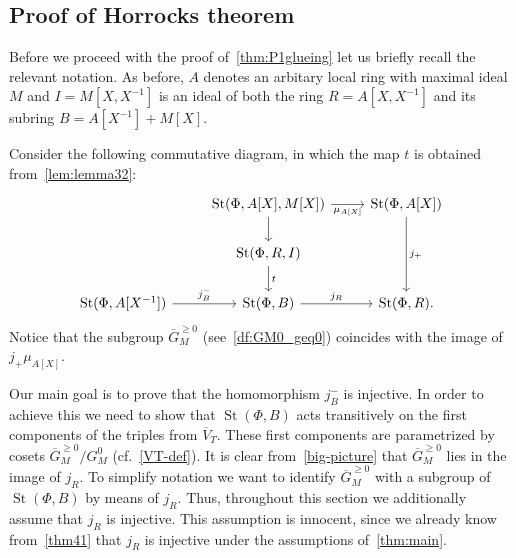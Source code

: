 \documentclass[10pt,a4paper,twoside]{article}
\theoremstyle{remark}
\theoremstyle{definition}
\numberwithin{lemma}{section}
\numberwithin{prop}{section}
\numberwithin{corollary}{section}
\numberwithin{externaltheorem}{section}
\DeclareMathOperator{\St}{St}
\newcommand{\inv}{^{-1}}
\numberwithin{equation}{section}
\begin{document}
\subsection{Proof of Horrocks theorem} \label{sec:P1glueing}
Before we proceed with the proof of~\cref{thm:P1glueing} let us briefly recall the relevant notation. As before, $A$ denotes an arbitary local ring with maximal ideal $M$ and $I = M[X, X\inv]$ is an ideal of both the ring $R=A[X, X\inv]$ and its subring $B = A[X\inv] + M[X]$.

Consider the following commutative diagram, in which the map $t$ is obtained from~\cref{lem:lemma32}:
\begin{equation} \label{big-picture} \begin{tikzcd} & \St(\Phi, A[X], M[X]) \arrow{r}[swap]{\mu_{A[X]}} \arrow{d} & \St(\Phi, A[X]) \arrow{dd}{j_+} \\ & \St(\Phi, R, I) \arrow{d}{t} & \\ \St(\Phi, A[X\inv]) \arrow{r}{j_B^-} & \St(\Phi, B) \arrow{r}{j_R} & \St(\Phi, R). \end{tikzcd} \end{equation}
Notice that the subgroup $\overline{G}_M^{\geq 0}$ (see~\cref{df:GM0_geq0}) coincides with the image of $j_+\mu_{A[X]}$.

Our main goal is to prove that the homomorphism $j_B^-$ is injective. 
In order to achieve this we need to show that $\St(\Phi, B)$ acts transitively on the first components of the triples from $\overline{V}_T$. These first components are parametrized by cosets $\overline{G}_M^{\geq 0}/G_M^0$ (cf.~\eqref{VT-def}). It is clear from~\eqref{big-picture} that $\overline{G}_M^{\geq 0}$ lies in the image of $j_R$.
To simplify notation we want to identify $\overline{G}_M^{\geq 0}$ with a subgroup of $\St(\Phi, B)$ by means of $j_R$. Thus, throughout this section we additionally assume that $j_R$ is injective. This assumption is innocent, since we already know from~\cref{thm41} that $j_R$ is injective under the assumptions of~\cref{thm:main}.
\end{document}
